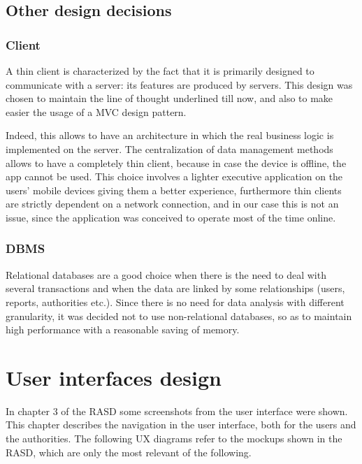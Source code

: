 \documentclass[12pt,a4paper]{report}
\begin{document}
		\section{Other design decisions}
			\subsection{Client}
				A thin client is characterized by the fact that it is primarily designed to communicate with a server: its features 
				are produced by servers. This design was chosen to maintain the line of thought underlined till now, and also to make easier the usage of a MVC design pattern.


				Indeed, this allows to have an architecture in which the real business logic is implemented on the server.
				The centralization of data management methods allows to have a completely thin client, because in case the
				device is offline, the app cannot be used. This choice involves a lighter executive application on the users'
				mobile devices giving them a better experience, furthermore thin clients are strictly dependent on a network 
				connection, and in our case this is not an issue, since the application was conceived to operate most 
				of the time online.


			\subsection{DBMS}
				Relational databases are a good choice when there is the need to deal with several transactions and 
				when the data are linked by some relationships (users, reports, authorities etc.). Since there is no need for
				data analysis with different granularity, it was decided not to use non-relational databases, so as to maintain
				high performance with a reasonable saving of memory.

	\chapter{User interfaces design}
	In chapter 3 of the RASD some screenshots from the user interface were shown. This chapter describes the navigation in the user interface, both for the users and the authorities. The following UX diagrams refer to the mockups shown in the RASD, which are only the most relevant of the following.
\end{document}
